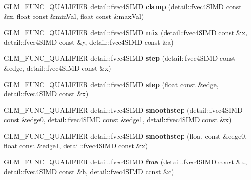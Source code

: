 \begin{DoxyCompactItemize}
\item 
G\+L\+M\+\_\+\+F\+U\+N\+C\+\_\+\+Q\+U\+A\+L\+I\+F\+I\+ER detail\+::fvec4\+S\+I\+MD {\bfseries clamp} (detail\+::fvec4\+S\+I\+MD const \&x, float const \&min\+Val, float const \&max\+Val)\hypertarget{namespaceglm_ae7db62bebbc1cdea7444d6f89313af2f}{}\label{namespaceglm_ae7db62bebbc1cdea7444d6f89313af2f}

\item 
G\+L\+M\+\_\+\+F\+U\+N\+C\+\_\+\+Q\+U\+A\+L\+I\+F\+I\+ER detail\+::fvec4\+S\+I\+MD {\bfseries mix} (detail\+::fvec4\+S\+I\+MD const \&x, detail\+::fvec4\+S\+I\+MD const \&y, detail\+::fvec4\+S\+I\+MD const \&a)\hypertarget{namespaceglm_a4b388e53d27196411517929d6ee91867}{}\label{namespaceglm_a4b388e53d27196411517929d6ee91867}

\item 
G\+L\+M\+\_\+\+F\+U\+N\+C\+\_\+\+Q\+U\+A\+L\+I\+F\+I\+ER detail\+::fvec4\+S\+I\+MD {\bfseries step} (detail\+::fvec4\+S\+I\+MD const \&edge, detail\+::fvec4\+S\+I\+MD const \&x)\hypertarget{namespaceglm_a0af681288eaacb38ded2a597bc7fd214}{}\label{namespaceglm_a0af681288eaacb38ded2a597bc7fd214}

\item 
G\+L\+M\+\_\+\+F\+U\+N\+C\+\_\+\+Q\+U\+A\+L\+I\+F\+I\+ER detail\+::fvec4\+S\+I\+MD {\bfseries step} (float const \&edge, detail\+::fvec4\+S\+I\+MD const \&x)\hypertarget{namespaceglm_ac7e3b091e30c01352c8349c656d52a9f}{}\label{namespaceglm_ac7e3b091e30c01352c8349c656d52a9f}

\item 
G\+L\+M\+\_\+\+F\+U\+N\+C\+\_\+\+Q\+U\+A\+L\+I\+F\+I\+ER detail\+::fvec4\+S\+I\+MD {\bfseries smoothstep} (detail\+::fvec4\+S\+I\+MD const \&edge0, detail\+::fvec4\+S\+I\+MD const \&edge1, detail\+::fvec4\+S\+I\+MD const \&x)\hypertarget{namespaceglm_acaa3fe01372937d4ee7739ad87db0f15}{}\label{namespaceglm_acaa3fe01372937d4ee7739ad87db0f15}

\item 
G\+L\+M\+\_\+\+F\+U\+N\+C\+\_\+\+Q\+U\+A\+L\+I\+F\+I\+ER detail\+::fvec4\+S\+I\+MD {\bfseries smoothstep} (float const \&edge0, float const \&edge1, detail\+::fvec4\+S\+I\+MD const \&x)\hypertarget{namespaceglm_a38415c03c75a84267151b370d866e42e}{}\label{namespaceglm_a38415c03c75a84267151b370d866e42e}

\item 
G\+L\+M\+\_\+\+F\+U\+N\+C\+\_\+\+Q\+U\+A\+L\+I\+F\+I\+ER detail\+::fvec4\+S\+I\+MD {\bfseries fma} (detail\+::fvec4\+S\+I\+MD const \&a, detail\+::fvec4\+S\+I\+MD const \&b, detail\+::fvec4\+S\+I\+MD const \&c)\hypertarget{namespaceglm_a3dd47df42a32adc14c604bed47633830}{}\label{namespaceglm_a3dd47df42a32adc14c604bed47633830}


\end{DoxyCompactItemize}

